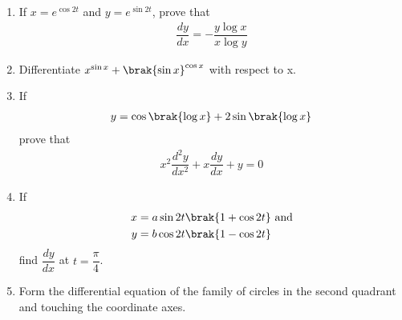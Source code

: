 \begin{enumerate}
    \item If $x=e^{\cos 2t}$ and $y=e^{\sin 2t}$, prove that
          \begin{align*}
              \dfrac{dy}{dx}= -\dfrac{y \log x}{x \log y}
          \end{align*}
    \item Differentiate $x^{\sin x}+ \brak{\sin x}^{\cos x}$ with respect to x.
    \item If
          \begin{align*}
              y=\cos \brak{\log x} + 2 \sin \brak{\log x}
          \end{align*}
          prove that
          \begin{align*}
              x^2 \dfrac{d^2 y}{dx^2} + x \dfrac{dy}{dx} +y =0
          \end{align*}
    \item If
          \begin{align*}
              x & =a\sin 2t\brak{1+\cos 2t} \text{ and} \\
              y & =b\cos 2t\brak{1-\cos 2t}
          \end{align*}
          find $\dfrac{dy}{dx}$ at $t=\dfrac{\pi}{4}$.
    \item Form the differential equation of the family of circles in the second quadrant and touching the coordinate axes.
\end{enumerate}